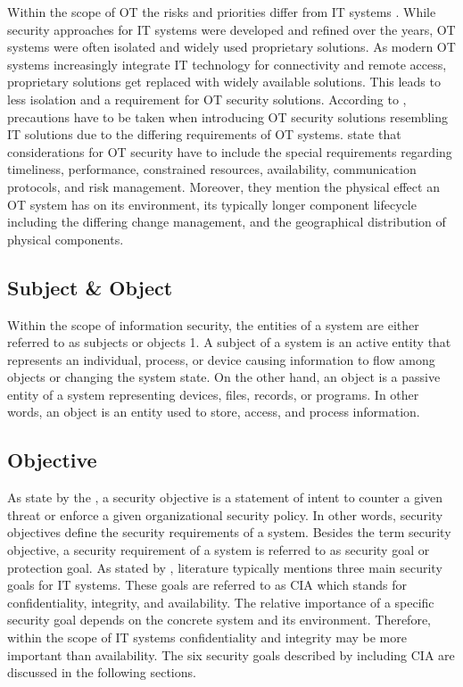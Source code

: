 Within the scope of OT the risks and priorities differ from IT systems \cite{Stouffer2023}.
While security approaches for IT systems were developed and refined over the years, OT systems were often isolated and widely used proprietary solutions.
As modern OT systems increasingly integrate IT technology for connectivity and remote access, proprietary solutions get replaced with widely available solutions.
This leads to less isolation and a requirement for OT security solutions.
According to \citeauthor{Stouffer2023}, precautions have to be taken when introducing OT security solutions resembling IT solutions due to the differing requirements of OT systems.
\citeauthor{Stouffer2023} state that considerations for OT security have to include the special requirements regarding timeliness, performance, constrained resources, availability, communication protocols, and risk management.
Moreover, they mention the physical effect an OT system has on its environment, its typically longer component lifecycle including the differing change management, and the geographical distribution of physical components.

\subsection{Subject \& Object}
Within the scope of information security, the entities of a system are either referred to as subjects or objects \cite{JTF2020}1.
A subject of a system is an active entity that represents an individual, process, or device causing information to flow among objects or changing the system state. 
On the other hand, an object is a passive entity of a system representing devices, files, records, or programs.
In other words, an object is an entity used to store, access, and process information.

\subsection{Objective}
As state by the \citeauthor{nsa2009} \cite{nsa2009}, a security objective is a statement of intent to counter a given threat or enforce a given organizational security policy.
In other words, security objectives define the security requirements of a system.
Besides the term security objective, a security requirement of a system is referred to as security goal or protection goal.
As stated by \citeauthor{Eckert2023} \cite{Eckert2023}, literature typically mentions three main security goals for IT systems.
These goals are referred to as CIA which stands for confidentiality, integrity, and availability.
The relative importance of a specific security goal depends on the concrete system and its environment.
Therefore, within the scope of IT systems confidentiality and integrity may be more important than availability.
The six security goals described by \citeauthor{Eckert2023} including CIA are discussed in the following sections.

